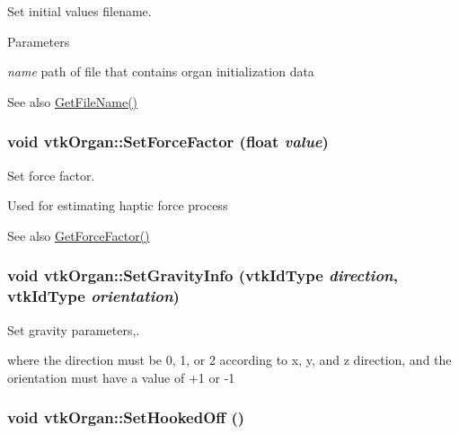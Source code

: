 Set initial values filename. 


\begin{DoxyParams}{Parameters}
\item[{\em name}]path of file that contains organ initialization data \end{DoxyParams}
\begin{DoxySeeAlso}{See also}
\hyperlink{classvtkOrgan_a83331bddcf2a07b54a5df5e6e23b130f}{GetFileName()} 
\end{DoxySeeAlso}
\hypertarget{classvtkOrgan_ae98b19d50a8f351e79e881b579215953}{
\subsubsection[{SetForceFactor}]{\setlength{\rightskip}{0pt plus 5cm}void vtkOrgan::SetForceFactor (float {\em value})}}
\label{classvtkOrgan_ae98b19d50a8f351e79e881b579215953}


Set force factor. 

Used for estimating haptic force process \begin{DoxySeeAlso}{See also}
\hyperlink{classvtkOrgan_a81b39e0f98712affccd17071791f6ad7}{GetForceFactor()} 
\end{DoxySeeAlso}
\hypertarget{classvtkOrgan_ae3f6ea53f0d615fae5f9e2796e4075a2}{
\subsubsection[{SetGravityInfo}]{\setlength{\rightskip}{0pt plus 5cm}void vtkOrgan::SetGravityInfo (vtkIdType {\em direction}, \/  vtkIdType {\em orientation})}}
\label{classvtkOrgan_ae3f6ea53f0d615fae5f9e2796e4075a2}


Set gravity parameters,. 

where the direction must be 0, 1, or 2 according to x, y, and z direction, and the orientation must have a value of +1 or -\/1 \hypertarget{classvtkOrgan_ad2ac78a6020fba61ff49edad8a3f6a22}{
\subsubsection[{SetHookedOff}]{\setlength{\rightskip}{0pt plus 5cm}void vtkOrgan::SetHookedOff ()}}
\label{classvtkOrgan_ad2ac78a6020fba61ff49edad8a3f6a22}


